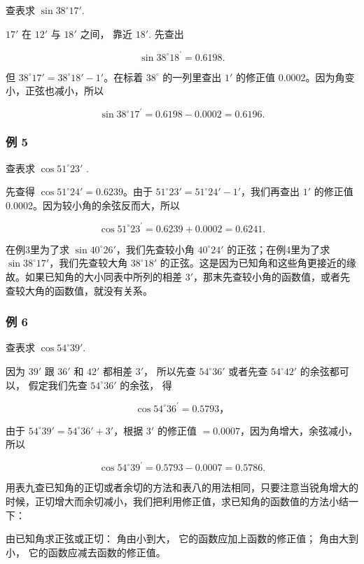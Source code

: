 查表求 \(\sin 38^{\circ}17'\).

 \(17'\) 在 \(12'\) 与 \(18'\) 之间， 靠近 \(18'\).
先查出

\[
\sin 38 ^{\circ} 18 ^{\prime} = 0.6198.
\]

但 \(38^{\circ}17' = 38^{\circ}18' - 1'\)。在标着 \(38^{\circ}\)
的一列里查出 \(1'\) 的修正值 0.0002。因为角变小，正弦也减小，所以

\[
\sin 38 ^{\circ} 17 ^{\prime} = 0.6198 - 0.0002 = 0.6196.
\]

\subsubsection{例 5}

查表求 \(\cos 51^{\circ}23'\) .

 先查得 \(\cos 51^{\circ}24' = 0.6239\)。由于
\(51^{\circ}23' = 51^{\circ}24' - 1'\)，我们再查出 \(1'\) 的修正值
0.0002。因为较小角的余弦反而大，所以

\[
\cos 51 ^{\circ} 23 ^{\prime} = 0.6239 + 0.0002 = 0.6241.
\]

在例3里为了求 \(\sin 40^{\circ}26'\)，我们先查较小角 \(40^{\circ}24'\)
的正弦；在例4里为了求 \(\sin 38^{\circ}17'\)，我们先查较大角
\(38^{\circ}18'\)
的正弦。这是因为已知角和这些角更接近的缘故。如果已知角的大小同表中所列的相差
\(3'\)，那末先查较小角的函数值，或者先查较大角的函数值，就没有关系。

\subsubsection{例 6}

查表求 \(\cos 54^{\circ}39'\).

 因为 \(39'\) 跟 \(36'\) 和 \(42'\) 都相差 \(3'\)，
所以先查 \(54^\circ 36'\) 或者先查 \(54^\circ 42'\) 的余弦都可以，
假定我们先查 \(54^\circ 36'\) 的余弦， 得

\[
\cos 54 ^{\circ} 36 ^{\prime} = 0.5793\text{，}
\]

由于 \(54^{\circ}39' = 54^{\circ}36' + 3'\)，根据 \(3'\) 的修正值
\(= 0.0007\)，因为角增大，余弦减小，所以

\[
\cos 54 ^{\circ} 39 ^{\prime} = 0.5793 - 0.0007 = 0.5786.
\]

用表九查已知角的正切或者余切的方法和表八的用法相同，只要注意当锐角增大的时候，正切增大而余切减小，我们把利用修正值，求已知角的函数值的方法小结一下：

由已知角求正弦或正切： 角由小到大， 它的函数应加上函数的修正值；
角由大到小， 它的函数应减去函数的修正值。

